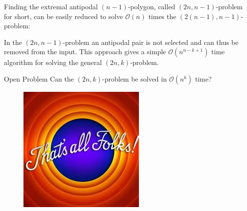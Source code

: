 \documentclass{beamer}
\begin{document}
\begin{frame}
Finding the extremal antipodal $(n-1)$-polygon, called $(2n, n-1)$-problem for short, can be easily
reduced to solve $\mathcal{O}(n)$ times the $(2(n - 1), n - 1)$-problem: \pause
\vspace{0.5cm}

In the $(2n, n - 1)$-problem an antipodal pair is not selected and can thus be removed
from the input. This approach gives a simple $\mathcal{O}(n^{n-k+1})$ time algorithm for solving
the general $(2n, k)$-problem.\pause
\vspace{0.5cm}

\begin{alertblock}{Open Problem}
Can the $(2n,k)$-problem be solved in $\mathcal{O}(n^k)$ time?
\end{alertblock}

\end{frame}

\begin{frame}
\begin{figure}
\includegraphics[scale=1]{folks}
\end{figure}
\end{frame}
\end{document}
